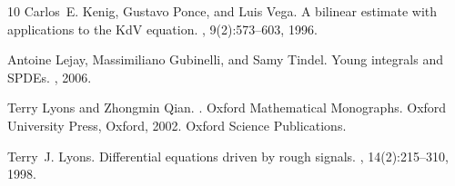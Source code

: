 \documentclass[a4paper,12pt,reqno]{article}
\begin{document}
\begin{thebibliography}{10}
Carlos~E. Kenig, Gustavo Ponce, and Luis Vega.
\newblock A bilinear estimate with applications to the {K}d{V} equation.
, 9(2):573--603, 1996.

Antoine Lejay, Massimiliano Gubinelli, and Samy Tindel.
\newblock Young integrals and {SPDE}s.
, 2006.

Terry Lyons and Zhongmin Qian.
.
\newblock Oxford Mathematical Monographs. Oxford University Press, Oxford,
  2002.
\newblock Oxford Science Publications.

Terry~J. Lyons.
\newblock Differential equations driven by rough signals.
, 14(2):215--310, 1998.

\end{thebibliography}
\end{document}
